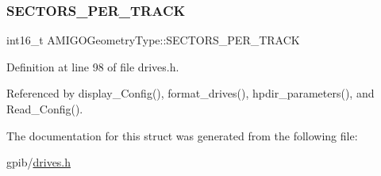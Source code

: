 \subsubsection{\texorpdfstring{S\+E\+C\+T\+O\+R\+S\+\_\+\+P\+E\+R\+\_\+\+T\+R\+A\+CK}{SECTORS\_PER\_TRACK}}
{\footnotesize\ttfamily int16\+\_\+t A\+M\+I\+G\+O\+Geometry\+Type\+::\+S\+E\+C\+T\+O\+R\+S\+\_\+\+P\+E\+R\+\_\+\+T\+R\+A\+CK}



Definition at line 98 of file drives.\+h.



Referenced by display\+\_\+\+Config(), format\+\_\+drives(), hpdir\+\_\+parameters(), and Read\+\_\+\+Config().



The documentation for this struct was generated from the following file\+:\begin{DoxyCompactItemize}
\item 
gpib/\hyperlink{drives_8h}{drives.\+h}\end{DoxyCompactItemize}
